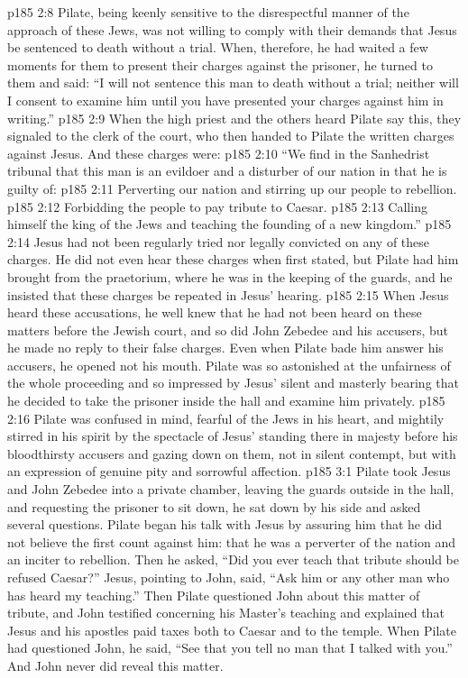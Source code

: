 \vs p185 2:8 Pilate, being keenly sensitive to the disrespectful manner of the approach of these Jews, was not willing to comply with their demands that Jesus be sentenced to death without a trial. When, therefore, he had waited a few moments for them to present their charges against the prisoner, he turned to them and said: “I will not sentence this man to death without a trial; neither will I consent to examine him until you have presented your charges against him in writing.”
\vs p185 2:9 When the high priest and the others heard Pilate say this, they signaled to the clerk of the court, who then handed to Pilate the written charges against Jesus. And these charges were:
\pc \vs p185 2:10 “We find in the Sanhedrist tribunal that this man is an evildoer and a disturber of our nation in that he is guilty of:
\pc \vs p185 2:11 \bibnobreakspace Perverting our nation and stirring up our people to rebellion.
\vs p185 2:12 \bibnobreakspace Forbidding the people to pay tribute to Caesar.
\vs p185 2:13 \bibnobreakspace Calling himself the king of the Jews and teaching the founding of a new kingdom.”
\pc \vs p185 2:14 Jesus had not been regularly tried nor legally convicted on any of these charges. He did not even hear these charges when first stated, but Pilate had him brought from the praetorium, where he was in the keeping of the guards, and he insisted that these charges be repeated in Jesus’ hearing.
\vs p185 2:15 When Jesus heard these accusations, he well knew that he had not been heard on these matters before the Jewish court, and so did John Zebedee and his accusers, but he made no reply to their false charges. Even when Pilate bade him answer his accusers, he opened not his mouth. Pilate was so astonished at the unfairness of the whole proceeding and so impressed by Jesus’ silent and masterly bearing that he decided to take the prisoner inside the hall and examine him privately.
\vs p185 2:16 Pilate was confused in mind, fearful of the Jews in his heart, and mightily stirred in his spirit by the spectacle of Jesus’ standing there in majesty before his bloodthirsty accusers and gazing down on them, not in silent contempt, but with an expression of genuine pity and sorrowful affection.
\vs p185 3:1 Pilate took Jesus and John Zebedee into a private chamber, leaving the guards outside in the hall, and requesting the prisoner to sit down, he sat down by his side and asked several questions. Pilate began his talk with Jesus by assuring him that he did not believe the first count against him: that he was a perverter of the nation and an inciter to rebellion. Then he asked, “Did you ever teach that tribute should be refused Caesar?” Jesus, pointing to John, said, \textcolor{ubdarkred}{“Ask him or any other man who has heard my teaching.”} Then Pilate questioned John about this matter of tribute, and John testified concerning his Master’s teaching and explained that Jesus and his apostles paid taxes both to Caesar and to the temple. When Pilate had questioned John, he said, “See that you tell no man that I talked with you.” And John never did reveal this matter.
